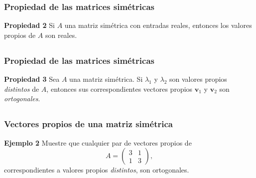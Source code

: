 \begin{frame}\frametitle{Propiedad de las matrices simétricas}
	
	\begin{prop}{\textbf{Propiedad 2}}
		\justifying
		Si $A$ una matriz simétrica con entradas reales, entonces los valores propios de $A$ son reales.		
	\end{prop}	
	
\end{frame}


\subsection{}

\begin{frame}\frametitle{Propiedad de las matrices simétricas}
	
	\begin{prop}{\textbf{Propiedad 3}}
		\justifying
		Sea $A$ una matriz simétrica. Si $\lambda_1$ y $\lambda_2$ son valores propios \textit{distintos} de $A$,
		entonces sus correspondientes vectores propios $\mathbf{v}_1$ y $\mathbf{v}_2$ son \textit{ortogonales}.		
	\end{prop}	
	
\end{frame}


\subsection{}

\begin{frame}\frametitle{Vectores propios de una matriz simétrica}
	
	\begin{ej}{\textbf{Ejemplo 2}}
		Muestre que cualquier par de vectores propios de 
		\[
		A =
		\left(
		\begin{array}{rr}
		3 & 1 \\[1mm]
		1 & 3
		\end{array}
		\right),
		\]	
		correspondientes a valores propios \textit{distintos}, son ortogonales.
	\end{ej}
	
\end{frame}


